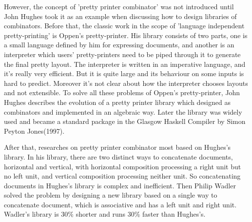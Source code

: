 However, the concept of 'pretty printer combinator' was not introduced until John Hughes took it as an example when discussing how to design libraries of combinators\cite{hughes1995design}. Before that, the classic work in the scope of 'language independent pretty-printing' is Oppen's pretty-printer\cite{oppen1980prettyprinting}. His library consists of two parts, one is a small language defined by him for expressing documents, and another is an interpreter which users' pretty-printers need to be piped through it to generate the final pretty layout. The interpreter is written in an imperative language, and it's really very efficient. But it is quite large and its behaviour on some inputs is hard to predict. Moreover it's not clear about how the interpreter chooses layouts and not extensible. To solve all these problems of Oppen's pretty-printer, John Hughes describes the evolution of a pretty printer library which designed as combinators and implemented in an algebraic way. Later the library was widely used and became a standard package in the Glasgow Haskell Compiler by Simon Peyton Jones(1997)\cite{jones1993glasgow}.

After that, researches on pretty printer combinator most based on Hughes's library. In his library, there are two distinct ways to concatenate documents, horizontal and vertical, with horizontal composition processing a right unit but no left unit, and vertical composition processing neither unit\cite{wadler2003prettier}. So concatenating documents in Hughes's library is complex and inefficient. Then Philip Wadler solved the problem by designing a new library based on a single way to concatenate document, which is associative and has a left unit and right unit. Wadler's library is 30\% shorter and runs 30\% faster than Hughes's\cite{wadler2003prettier}.





